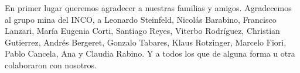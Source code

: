 
\begin{acknowledgments}

En primer lugar queremos agradecer a nuestras familias y amigos. Agradecemos al grupo mina del INCO, a Leonardo Steinfeld, Nicolás Barabino, Francisco Lanzari, María Eugenia Corti, Santiago Reyes, Viterbo Rodríguez, Christian Gutierrez, Andrés Bergeret, Gonzalo Tabares, Klaus Rotzinger, Marcelo Fiori, Pablo Cancela, Ana y Claudia Rabino. Y a todos los que de alguna forma u otra colaboraron con nosotros.

\end{acknowledgments}